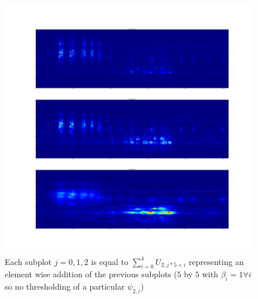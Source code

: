 \documentclass[a4paper]{report}
\begin{document}
\begin{figure}[H]
\begin{center}
\includegraphics[scale=0.1]{RN5821_3.png}\caption{Each subplot $j=0,1,2$ is equal to $\sum_{i=0}^4 U_{2,j*5+i}$ representing an element wise addition of the previous subplots ($5$ by $5$ with $\beta_i=1\forall i$ so no thresholding of a particular $\psi_{2,i}$) }
\end{center}
\end{figure}
\end{document}
